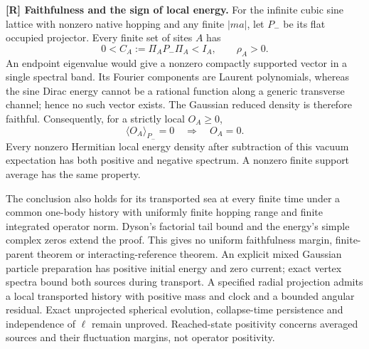 \noindent\textbf{[R] Faithfulness and the sign of local energy.}
For the infinite cubic sine lattice with nonzero native hopping and any
finite $|ma|$, let $P_-$ be its flat occupied projector.  Every finite
set of sites $A$ has
\[
 0<C_A:=\Pi_A P_-\Pi_A<I_A,\qquad \rho_A>0.
\]
An endpoint eigenvalue would give a nonzero compactly supported vector
in a single spectral band.  Its Fourier components are Laurent
polynomials, whereas the sine Dirac energy cannot be a rational
function along a generic transverse channel; hence no such vector exists.
The Gaussian reduced density is therefore faithful.  Consequently,
for a strictly local $O_A\geq0$,
\[
 \langle O_A\rangle_{P_-}=0\quad\Longrightarrow\quad O_A=0.
\]
Every nonzero Hermitian local energy density after subtraction of this
vacuum expectation has both positive and negative spectrum.  A nonzero
finite support average has the same property.

The conclusion also holds for its transported sea at every finite time
under a common one-body history with uniformly finite hopping range
and finite integrated operator norm.  Dyson's factorial tail bound
and the energy's simple complex zeros extend the proof.  This gives
no uniform faithfulness margin, finite-parent theorem or interacting-reference theorem.
An explicit mixed Gaussian particle preparation has positive initial
energy and zero current; exact vertex spectra bound both sources during
transport.  A specified radial projection admits a local transported
history with positive mass and clock and a bounded angular residual.
Exact unprojected spherical evolution, collapse-time persistence and
independence of $\ell$ remain unproved.  Reached-state positivity concerns
averaged sources and their fluctuation margins, not operator positivity.


